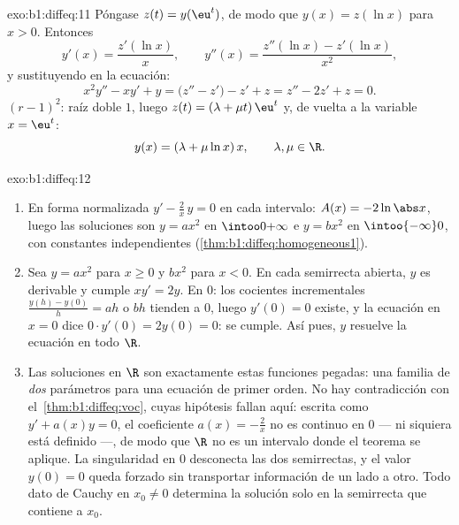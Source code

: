 \begin{solution}{exo:b1:diffeq:11}
Póngase $z(t) = y(\eu^t)$, de modo que $y(x) = z(\ln x)$ para $x > 0$. Entonces
\[
y'(x) = \frac{z'(\ln x)}x,
\qquad
y''(x) = \frac{z''(\ln x) - z'(\ln x)}{x^2} ,
\]
y sustituyendo en la ecuación:
\[
x^2y'' - xy' + y = \bigl(z'' - z'\bigr) - z' + z
= z'' - 2z' + z = 0 .
\]
 $(r - 1)^2$: raíz doble $1$, luego
$z(t) = (\lambda + \mu t)\,\eu^t$ y, de vuelta a la variable $x = \eu^t$:
\[
y(x) = (\lambda + \mu\ln x)\,x,
\qquad \lambda, \mu \in \R .
\]
\end{solution}

\begin{solution}{exo:b1:diffeq:12}
\begin{enumerate}
  \item En forma normalizada $y' - \frac2x\,y = 0$ en cada intervalo:
        $A(x) = -2\ln\abs x$, luego las soluciones son $y = a x^2$ en
        $\intoo0{+\infty}$ e $y = b x^2$ en $\intoo{-\infty}0$, con
        constantes independientes
        (\cref{thm:b1:diffeq:homogeneous1}).
  \item Sea $y = ax^2$ para $x \geq 0$ y $bx^2$ para $x < 0$. En cada
        semirrecta abierta, $y$ es derivable y cumple $xy' = 2y$. En
        $0$: los cocientes incrementales $\frac{y(h) - y(0)}h = ah$ o
        $bh$ tienden a $0$, luego $y'(0) = 0$ existe, y la ecuación en
        $x = 0$ dice $0 \cdot y'(0) = 2y(0) = 0$: se cumple. Así pues,
        $y$ resuelve la ecuación en todo $\R$.
  \item Las soluciones en $\R$ son exactamente estas funciones
        pegadas: una familia de \emph{dos} parámetros para una
        ecuación de primer orden. No hay contradicción con
        el~\cref{thm:b1:diffeq:voc}, cuyas hipótesis fallan aquí:
        escrita como $y' + a(x)y = 0$, el coeficiente
        $a(x) = -\frac2x$ no es continuo en $0$ --- ni siquiera está
        definido ---, de modo que $\R$ no es un intervalo donde el
        teorema se aplique. La singularidad en $0$ desconecta las dos
        semirrectas, y el valor $y(0) = 0$ queda forzado sin
        transportar información de un lado a otro. Todo dato de Cauchy
        en $x_0 \neq 0$ determina la solución solo en la semirrecta
        que contiene a $x_0$.
\end{enumerate}
\end{solution}

